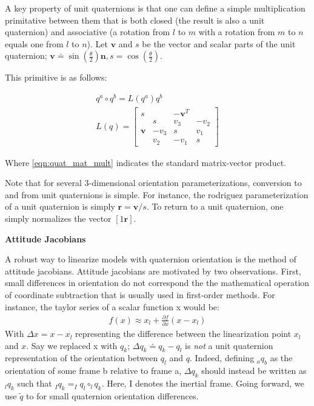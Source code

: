 \documentclass{article}
\begin{document}
A key property of unit quaternions is that one can define a simple multiplication primitative between them that is both closed (the result is also a unit quaternion) and associative (a rotation from $l$ to $m$ with a rotation from $m$ to $n$ equals one from $l$ to $n$). Let $\pmb{v}$ and $s$ be the vector and scalar parts of the unit quaternion; $\pmb{v} \doteq \sin(\frac{\theta}{2})\pmb{n}, s = \cos(\frac{\theta}{2})$.

This primitive is as follows:

\begin{gather}
    q^a \circ q^b = L(q^a)q^b \label{eqn:quat_mat_mult}\\
    L(q) = \left[
        \begin{array}{cccc}
            s       &      & -\pmb{v}^T &      \\
                    & s    & v_3        & -v_2 \\
            \pmb{v} & -v_3 & s          & v_1  \\
                    & v_2  & -v_1       & s
        \end{array}
        \right]
\end{gather}

Where \ref{eqn:quat_mat_mult} indicates the standard matrix-vector product.

Note that for several 3-dimensional orientation parameterizations, conversion to and from unit quaternions is simple. For instance, the rodriguez parameterization of a unit quaternion is simply $\pmb{r} = \pmb{v}/s$. To return to a unit quaternion, one simply normalizes the vector $[1 \pmb{r}]$.

\begin{center}
    \textbf{Attitude Jacobians}
\end{center}


A robust way to linearize models with quaternion orientation is the method of attitude jacobians. Attitude jacobians are motivated by two observations. First, small differences in orientation do not correspond the the mathematical operation of coordinate subtraction that is usually used in first-order methods. For instance, the taylor series of a scalar function x would be:
\begin{gather}
    f(x) \approx x_l + \frac{\partial f}{\partial x}(x - x_l)
\end{gather}
With $\Delta x = x - x_l$ representing the difference between the linearization point $x_l$ and $x$. Say we replaced x with $q_k$; $\Delta q_k \doteq q_k - q_l$ is \textit{not} a unit quaternion representation of the orientation between $q_l$ and $q$. Indeed, defining $_a q_b$ as the orientation of some frame b relative to frame a, $\Delta q_k$ should instead be written as $_l q_k$ such that $_Iq_k = _Iq_l \circ _lq_k$. Here, I denotes the inertial frame. Going forward, we use $\tilde{q}$ to for small quaternion orientation differences.
\end{document}
